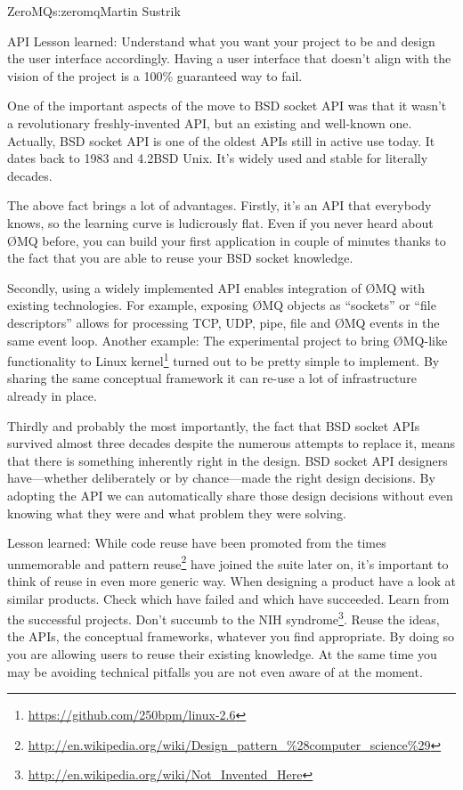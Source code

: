 \begin{aosachapter}{ZeroMQ}{s:zeromq}{Martin Sustrik}
\begin{aosasect1}{API}
Lesson learned: Understand what you want your project to be and design
the user interface accordingly. Having a user interface that doesn't align with
the vision of the project is a 100\% guaranteed way to fail.

One of the important aspects of the move to BSD socket API was that it
wasn't a revolutionary freshly-invented API, but an existing and
well-known one. Actually, BSD socket API is one of the oldest APIs
still in active use today. It dates back to 1983 and 4.2BSD Unix. It's
widely used and stable for literally decades.

The above fact brings a lot of advantages.  Firstly, it's an API that
everybody knows, so the learning curve is ludicrously flat. Even if
you never heard about {\O}MQ before, you can build your first application
in couple of minutes thanks to the fact that you are able to reuse
your BSD socket knowledge.

Secondly, using a widely implemented API enables integration of {\O}MQ
with existing technologies. For example, exposing {\O}MQ objects as
``sockets'' or ``file descriptors'' allows for processing TCP, UDP,
pipe, file and {\O}MQ events in the same event loop. Another example: The
experimental project to bring {\O}MQ-like functionality to Linux
kernel\footnote{\url{https://github.com/250bpm/linux-2.6}} turned out
to be pretty simple to implement. By sharing the same conceptual
framework it can re-use a lot of infrastructure already in place.

Thirdly and probably the most importantly, the fact that BSD socket
APIs survived almost three decades despite the numerous attempts to
replace it, means that there is something inherently right in the
design. BSD socket API designers have---whether deliberately or by
chance---made the right design decisions. By adopting the API we can
automatically share those design decisions without even knowing what
they were and what problem they were solving.

Lesson learned: While code reuse have been promoted from the times
unmemorable and pattern
reuse\footnote{\url{http://en.wikipedia.org/wiki/Design_pattern_\%28computer_science\%29}}
have joined the suite later on, it's important to think of reuse in
even more generic way. When designing a product have a look at similar
products. Check which have failed and which have succeeded. Learn from
the successful projects. Don't succumb to the NIH
syndrome\footnote{\url{http://en.wikipedia.org/wiki/Not_Invented_Here}}. Reuse
the ideas, the APIs, the conceptual frameworks, whatever you find
appropriate. By doing so you are allowing users to reuse their
existing knowledge. At the same time you may be avoiding technical
pitfalls you are not even aware of at the moment.


\end{aosasect1}
\end{aosachapter}
